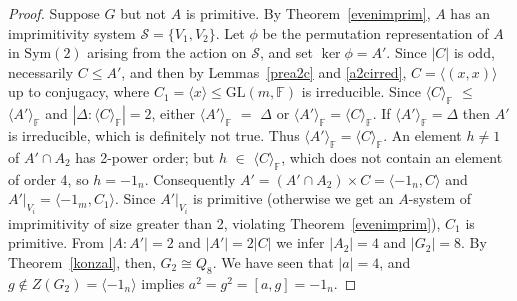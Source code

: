 \documentclass[12pt]{amsart}
\theoremstyle{definition}
\theoremstyle{remark}
\begin{document}
\begin{proof}
 Suppose $G$ but not $A$ is primitive.
 By Theorem~\ref{evenimprim},
 $A$ has an imprimitivity system $\mathcal{S} = \{ V_1, V_2 \}$.
 Let $\phi$ be the permutation representation of $A$ in 
 $\mathrm{Sym}(2)$ arising from the action on $\mathcal{S}$, 
 and set $\ker \phi=A'$.
 Since $|C|$ is odd, necessarily $C \leq A'$, 
and then by
 Lemmas~\ref{prea2c} and \ref{a2cirred},
 $C = \langle (x,x) \rangle$ up to conjugacy,
 where $C_1 = \langle x \rangle \leq \mathrm{GL}(m, \mathbb{F})$ 
 is irreducible. Since $\langle C\rangle_\mathbb{F}$ $\leq$
 $\langle A'\rangle_\mathbb{F}$
 and $|\Delta : \langle C\rangle_\mathbb{F}| =2$, 
 either $\langle A' \rangle_\mathbb{F}$ $=$ 
 $\Delta$ or $\langle A'\rangle_\mathbb{F} = 
 \langle C\rangle_\mathbb{F}$. 
 If $\langle A' \rangle_\mathbb{F} = 
 \Delta$ then $A'$ is irreducible, 
 which is definitely not true.
 Thus $\langle A'\rangle_\mathbb{F} = 
 \langle C\rangle_\mathbb{F}$.    
 An element $h\neq 1$ of $A' \cap A_2$ has 2-power order;
 but $h$ $\in$  $\langle C\rangle_\mathbb{F}$, which
 does not contain an element of order 4, so $h = -1_n$. 
 Consequently 
 $A' = (A' \cap A_2)\times C = \langle -1_n, C \rangle$ and 
 $A'|_{V_i} = \langle -1_m, C_1 \rangle$. Since 
 $A'|_{V_i}$ is primitive (otherwise we get an $A$-system of
 imprimitivity of size greater than 2, violating 
 Theorem~\ref{evenimprim}), $C_1$ is primitive.
 From $|A: A'|=2$ and $|A'| = 2|C|$ we infer $|A_2| =4$
 and $|G_2|=8$. 
 By Theorem~\ref{konzal}, then, $G_2 \cong Q_8$.
 We have seen that $|a|=4$, and 
 $g \notin Z(G_2) = \langle -1_n \rangle$
 implies 
 $a^2=g^2= [a,g] = -1_n$.


\end{proof}
\end{document}

